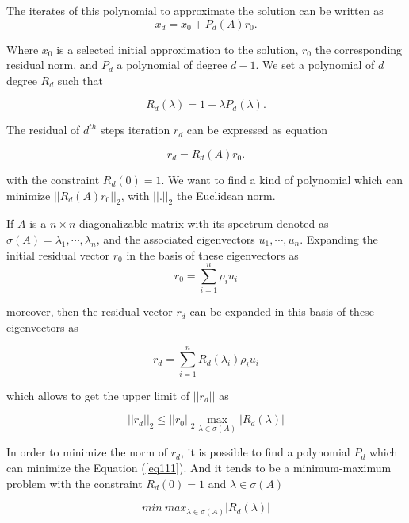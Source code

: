 {The iterates of this polynomial to approximate the solution can be written as 
\begin{equation}
x_d=x_0+P_d(A)r_0.
\end{equation}

Where \(x_0\) is a selected initial approximation to the solution, \(r_0\) the corresponding residual norm, and \(P_d\) a polynomial of degree \(d-1\). We set a polynomial of $d$ degree \(R_d\) such that

\begin{equation}
R_d(\lambda)=1-\lambda P_d(\lambda).
\end{equation}

The residual of \(d^{th}\) steps iteration \(r_d\) can be expressed as equation 

\begin{equation}
\label{r_d=R_d(A)r_0}
r_d=R_d(A)r_0.
\end{equation}

with the constraint \(R_d(0)=1\). We want to find a kind of polynomial which can minimize \(||R_d(A)r_0||_2\), with \(||.||_2\) the Euclidean norm.

If $A$ is a $n \times n$ diagonalizable matrix with its spectrum denoted as \(\sigma(A)=\lambda_1, \cdots, \lambda_n\), and the associated eigenvectors \(u_1, \cdots, u_n\). Expanding the initial residual vector $r_0$ in the basis of these eigenvectors as
\begin{equation}
\label{r0}
r_0=\sum_{i=1}^{n}\rho_i u_i
\end{equation}

moreover, then the residual vector \(r_d\) can be expanded in this basis of these eigenvectors as

\begin{equation}
\label{rn}
r_d=\sum_{i=1}^{n}R_d(\lambda_i)\rho_i u_i
\end{equation}

which allows to get the upper limit of $||r_d||$ as 

\begin{equation}
\label{eq111}
||r_d||_2 \leq ||r_0||_2 \max_{\lambda \in \sigma(A)}|R_d(\lambda)|
\end{equation}

In order to minimize the norm of \(r_d\), it is possible to find a polynomial $P_d$ which can minimize the Equation (\ref{eq111}). And it tends to be a minimum-maximum problem with the constraint \(R_d(0)=1\) and \(\lambda \in  \sigma(A)\)

\begin{equation}
min\ max_{\lambda \in \sigma (A)}|R_d(\lambda)|
\end{equation}

}
